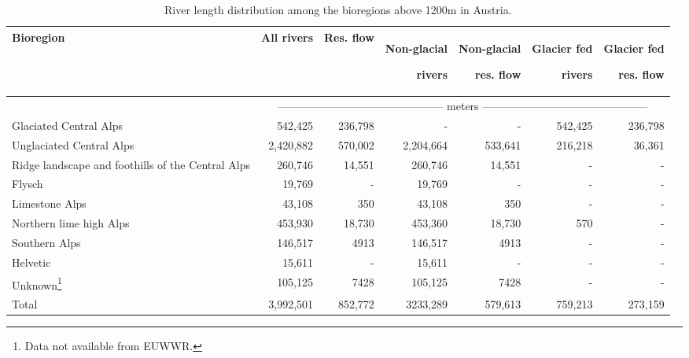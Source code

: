\begin{table}[htbp]
	\small                                                       %
\caption{River length distribution among the bioregions above 1200m in Austria.}
\begin{minipage}{\linewidth}
	\renewcommand\footnoterule{}
	\begin{tabular}{p{}rrrrrr}
	
		\toprule
		\multicolumn{1}{R{.12\textwidth}}{Bioregion} &
		\multicolumn{1}{R{.11\textwidth}}{All rivers} &
		\multicolumn{1}{B{.11\textwidth}}{Res. flow} &
		\multicolumn{1}{B{.12\textwidth}}{Non-glacial \par\noindent rivers} &
		\multicolumn{1}{B{.12\textwidth}}{Non-glacial \par\noindent res. flow} &
		\multicolumn{1}{B{.12\textwidth}}{Glacier fed \par\noindent rivers} &
		\multicolumn{1}{B{.12\textwidth}}{Glacier fed \par\noindent res. flow} \\

		\hline
		\hline
		& \multicolumn{6}{c}{\footnotesize --------------------------------------------- meters ---------------------------------------------}	\\
		Glaciated Central Alps		& 542,425 	& 236,798 	& -      	& -      	& 542,425 	& 236,798	\\
		Unglaciated Central Alps 	& 2,420,882 & 570,002 	& 2,204,664 & 533,641 	& 216,218 	& 36,361 	\\
		Ridge landscape and foothills of the Central Alps
							 		& 260,746 	& 14,551 	& 260,746	& 14,551 	& -      	& - 		\\
		Flysch 						& 19,769 	& -      	& 19,769 	& -      	& -      	& -			\\
		Limestone Alps				& 43,108 	& 350   	& 43,108 	& 350   	& -      	& -			\\
		Northern lime high Alps 	& 453,930 	& 18,730 	& 453,360	& 18,730 	& 570   	& -			\\
		Southern Alps 				& 146,517 	& 4913  	& 146,517 	& 4913  	& -      	& -			\\
		Helvetic 					& 15,611 	& -      	& 15,611 	& -      	& -      	& -			\\
		Unknown\footnote{Data not available from EUWWR.}
									& 105,125 	& 7428  	& 105,125 	& 7428  	& -      	& -			\\
		\cmidrule(lr){2-2} \cmidrule(lr){3-3} \cmidrule(lr){4-4} \cmidrule(lr){5-5} \cmidrule(lr){6-6} \cmidrule(lr){7-7} 
		Total 						& 3,992,501 & 852,772 	& 3233,289 	& 579,613	& 759,213 	& 273,159 	\\
		\bottomrule
	\end{tabular}%
	\end{minipage}
	\label{tab:length_bioregion}%
\end{table}%



